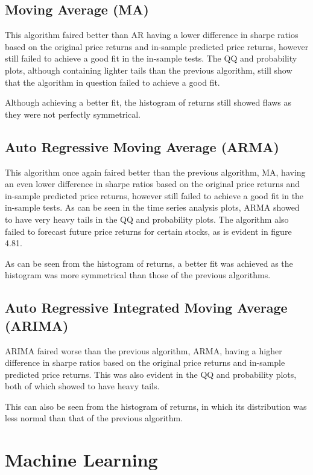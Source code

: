 \subsection{Moving Average (MA)}
This algorithm faired better than AR having a lower difference in sharpe ratios based on the original price returns and in-sample predicted price returns, however still failed to achieve a good fit in the in-sample tests. The QQ and probability plots, although containing lighter tails than the previous algorithm, still show that the algorithm in question failed to achieve a good fit.

Although achieving a better fit, the histogram of returns still showed flaws as they were not perfectly symmetrical.

\subsection{Auto Regressive Moving Average (ARMA)}
This algorithm once again faired better than the previous algorithm, MA, having an even lower difference in sharpe ratios based on the original price returns and in-sample predicted price returns, however still failed to achieve a good fit in the in-sample tests. As can be seen in the time series analysis plots, ARMA showed to have very heavy tails in the QQ and probability plots. The algorithm also failed to forecast future price returns for certain stocks, as is evident in figure 4.81.

As can be seen from the histogram of returns, a better fit was achieved as the histogram was more symmetrical than those of the previous algorithms.

\subsection{Auto Regressive Integrated Moving Average (ARIMA)}
ARIMA faired worse than the previous algorithm, ARMA, having a higher difference in sharpe ratios based on the original price returns and in-sample predicted price returns. This was also evident in the QQ and probability plots, both of which showed to have heavy tails.

This can also be seen from the histogram of returns, in which its distribution was less normal than that of the previous algorithm.

\section{Machine Learning}

